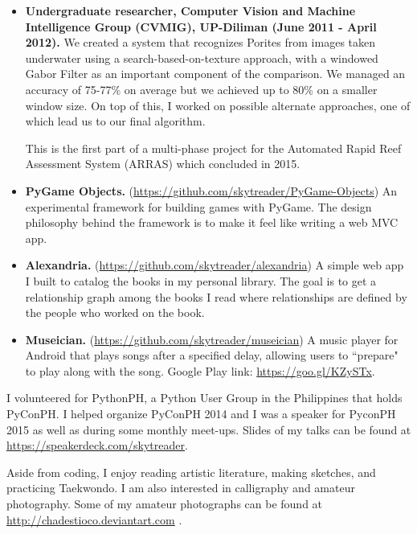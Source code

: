 \documentclass{article}
\begin{document}
    \begin{itemize}
      \item \textbf{Undergraduate researcher, Computer Vision and Machine Intelligence Group (CVMIG), UP-Diliman
      (June 2011 - April 2012).} We created a system that recognizes Porites from images taken
      underwater using a search-based-on-texture approach, with a windowed Gabor Filter as an important component
      of the comparison. We managed an accuracy of 75-77\% on average but we achieved up to 80\% on a smaller
      window size. On top of this, I worked on possible alternate approaches, one of which lead us to our final
      algorithm.

      This is the first part of a multi-phase project for the Automated Rapid Reef Assessment System (ARRAS) which
      concluded in 2015.

    \end{itemize}

    \begin{itemize}
      \item \textbf{PyGame Objects.} (\url{https://github.com/skytreader/PyGame-Objects})
      An experimental framework for building games with PyGame. The design philosophy behind the framework
      is to make it feel like writing a web MVC app.


      \item \textbf{Alexandria.} (\url{https://github.com/skytreader/alexandria})
      A simple web app I built to catalog the books in my personal library. The goal is to
      get a relationship graph among the books I read where relationships are defined
      by the people who worked on the book.


      \item \textbf{Museician.} (\url{https://github.com/skytreader/museician})
      A music player for Android that plays songs after a specified delay, allowing
      users to ``prepare" to play along with the song. Google Play link:
      \url{https://goo.gl/KZySTx}.

    \end{itemize}

  \breather
  I volunteered for PythonPH, a Python User Group in the Philippines that holds PyConPH. I helped organize PyConPH 2014 and
  I was a speaker for PyconPH 2015 as well as during some monthly meet-ups. Slides of my talks can be found at \url{https://speakerdeck.com/skytreader}.

  Aside from coding, I enjoy reading artistic literature, making sketches, and practicing Taekwondo. I am also interested in
  calligraphy and amateur photography. Some of my amateur photographs can be found at \url{http://chadestioco.deviantart.com} .
  
\end{document}
